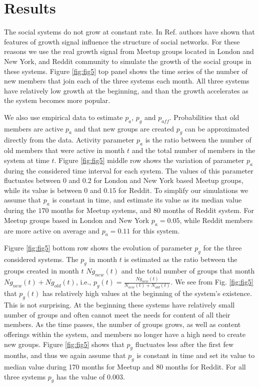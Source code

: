 \section{Results}

The social systems do not grow at constant rate. In Ref. \cite{vranic2021growth} authors have shown that features of growth signal influence the  structure of social networks. For these reasons we use the real growth signal from Meetup groups located in London and New York, and Reddit community to simulate the growth of the social groups in these systems. Figure \ref{fig:fig5} top panel shows the time series of the number of new members that join each of the three systems each month. All three systems have relatively low growth at the beginning, and than the growth accelerates as the system becomes more popular.


We also use empirical data to estimate $p_{a}$, $p_{g}$ and $p_{aff}$. Probabilities that old members are active $p_a$ and that new groups are created $p_g$ can be approximated directly from the data. Activity parameter $p_{a}$ is the ratio between the number of old members that were active in month $t$ and the total number of members in the system at time $t$. Figure \ref{fig:fig5} middle row shows the variation of parameter $p_{a}$ during the considered time interval for each system. The values of this parameter fluctuates between $0$ and $0.2$ for London and New York based Meetup groups, while its value is between $0$ and $0.15$ for Reddit. To simplify our simulations we assume that $p_{a}$ is constant in time, and estimate its value as its median value during the $170$ months for Meetup systems, and $80$ months of Reddit system. For Meetup groups based in London and New York $p_{a}=0.05$, while Reddit members are more active on average and $p_{a}=0.11$ for this system.

Figure \ref{fig:fig5} bottom row shows the evolution of parameter $p_{g}$ for the three considered systems. The $p_{g}$ in month $t$ is estimated as the ratio between the groups created in month $t$ $Ng_{new}(t)$ and the total number of groups that month $Ng_{new}(t)+Ng_{old}(t)$, i.e., $p_{g}(t)=\frac{Ng_{new}(t)}{N_{new}(t)+N_{old}(t)}$. We see from Fig. \ref{fig:fig5} that $p_{g}(t)$ has relatively high values at the beginning of the system's existence. This is not surprising. At the beginning these systems have relatively small number of groups and often cannot meet the needs for content of all their members. As the time passes, the number of groups grows, as well as content offerings within the system, and members no longer have a high need to create new groups. Figure \ref{fig:fig5} shows that $p_{g}$ fluctuates less after the first few months, and thus we again assume that $p_{g}$ is constant in time and set its value to median value during 170 months for Meetup and 80 months for Reddit. For all three systems $p_{g}$ has the value of $0.003$.

